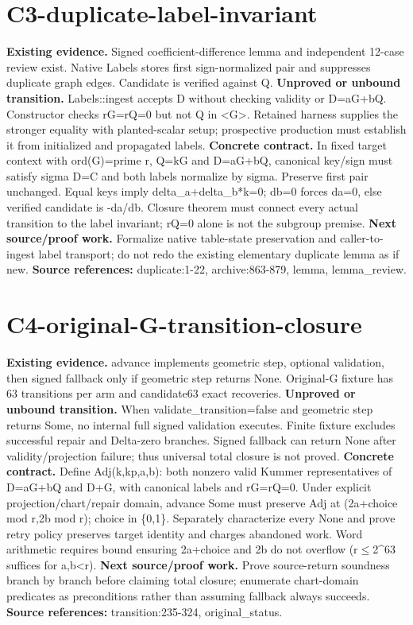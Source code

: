 \documentclass[10pt]{article}
\begin{document}
\section*{C3-duplicate-label-invariant}
\textbf{Existing evidence.} Signed coefficient-difference lemma and independent 12-case review exist. Native Labels stores first sign-normalized pair and suppresses duplicate graph edges. Candidate is verified against Q.
\textbf{Unproved or unbound transition.} Labels::ingest accepts D without checking validity or D=aG+bQ. Constructor checks rG=rQ=0 but not Q in <G>. Retained harness supplies the stronger equality with planted-scalar setup; prospective production must establish it from initialized and propagated labels.
\textbf{Concrete contract.} In fixed target context with ord(G)=prime r, Q=kG and D=aG+bQ, canonical key/sign must satisfy sigma D=C and both labels normalize by sigma. Preserve first pair unchanged. Equal keys imply delta\_a+delta\_b*k=0; db=0 forces da=0, else verified candidate is -da/db. Closure theorem must connect every actual transition to the label invariant; rQ=0 alone is not the subgroup premise.
\textbf{Next source/proof work.} Formalize native table-state preservation and caller-to-ingest label transport; do not redo the existing elementary duplicate lemma as if new.
\textbf{Source references:} duplicate:1-22, archive:863-879, lemma, lemma\_review.
\section*{C4-original-G-transition-closure}
\textbf{Existing evidence.} advance implements geometric step, optional validation, then signed fallback only if geometric step returns None. Original-G fixture has 63 transitions per arm and candidate63 exact recoveries.
\textbf{Unproved or unbound transition.} When validate\_transition=false and geometric step returns Some, no internal full signed validation executes. Finite fixture excludes successful repair and Delta-zero branches. Signed fallback can return None after validity/projection failure; thus universal total closure is not proved.
\textbf{Concrete contract.} Define Adj(k,kp,a,b): both nonzero valid Kummer representatives of D=aG+bQ and D+G, with canonical labels and rG=rQ=0. Under explicit projection/chart/repair domain, advance Some must preserve Adj at (2a+choice mod r,2b mod r); choice in \{0,1\}. Separately characterize every None and prove retry policy preserves target identity and charges abandoned work. Word arithmetic requires bound ensuring 2a+choice and 2b do not overflow (r$\le$2\textasciicircum{}63 suffices for a,b<r).
\textbf{Next source/proof work.} Prove source-return soundness branch by branch before claiming total closure; enumerate chart-domain predicates as preconditions rather than assuming fallback always succeeds.
\textbf{Source references:} transition:235-324, original\_status.
\newpage
\end{document}
